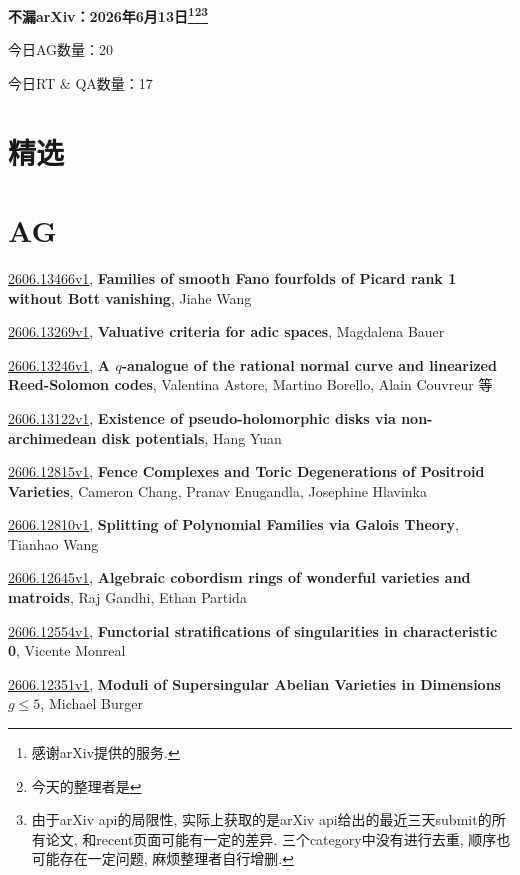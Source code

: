 \documentclass[9pt, a4paper]{article}
\theoremstyle{plain}
\theoremstyle{definition}
\theoremstyle{remark}
\newcommand{\arxiv}[3]{\href{https://arxiv.org/abs/#1}{#1}, \textbf{\textcolor{arxivblue}{#2}}, #3}
\newcommand{\AGnumber}{20}
\newcommand{\RTQAnumber}{17}
\newcommand{\NewestDate}{2026年6月13日}
\newcommand{\todayarXiver}{} %
\begin{document}
\begin{center}
    \Huge\textbf{不漏arXiv：\NewestDate\footnote{感谢arXiv提供的服务.}\footnote{今天的整理者是\todayarXiver}\footnote{由于arXiv api的局限性, 实际上获取的是arXiv api给出的最近三天submit的所有论文, 和recent页面可能有一定的差异. 三个category中没有进行去重, 顺序也可能存在一定问题, 麻烦整理者自行增删.}} \\
\end{center}

\setcounter{section}{-1}

\begin{center}
    今日AG数量：\AGnumber
    
    今日RT \& QA数量：\RTQAnumber
    
\end{center}


\section{精选}


\section{AG}
\arxiv{2606.13466v1}{Families of smooth Fano fourfolds of Picard rank 1 without Bott vanishing}{Jiahe Wang}

\arxiv{2606.13269v1}{Valuative criteria for adic spaces}{Magdalena Bauer}

\arxiv{2606.13246v1}{A $q$-analogue of the rational normal curve and linearized Reed-Solomon codes}{Valentina Astore, Martino Borello, Alain Couvreur 等}

\arxiv{2606.13122v1}{Existence of pseudo-holomorphic disks via non-archimedean disk potentials}{Hang Yuan}

\arxiv{2606.12815v1}{Fence Complexes and Toric Degenerations of Positroid Varieties}{Cameron Chang, Pranav Enugandla, Josephine Hlavinka}

\arxiv{2606.12810v1}{Splitting of Polynomial Families via Galois Theory}{Tianhao Wang}

\arxiv{2606.12645v1}{Algebraic cobordism rings of wonderful varieties and matroids}{Raj Gandhi, Ethan Partida}

\arxiv{2606.12554v1}{Functorial stratifications of singularities in characteristic 0}{Vicente Monreal}

\arxiv{2606.12351v1}{Moduli of Supersingular Abelian Varieties in Dimensions $g\leq 5$}{Michael Burger}
\end{document}
